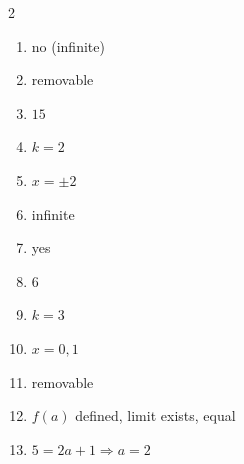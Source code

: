 \documentclass[11pt]{article}
\begin{document}
\begin{keybox}
\begin{multicols}{2}
\small
\begin{enumerate}[leftmargin=*,itemsep=3pt]
  \item no (infinite)
  \item removable
  \item $15$
  \item $k=2$
  \item $x=\pm2$
  \item infinite
  \item yes
  \item $6$
  \item $k=3$
  \item $x=0,1$
  \item removable
  \item $f(a)$ defined, limit exists, equal
  \item $5=2a+1\Rightarrow a=2$
\end{enumerate}
\end{multicols}
\end{keybox}
\end{document}
